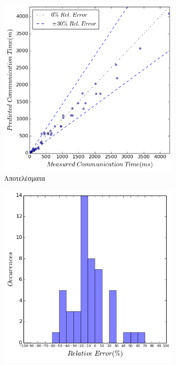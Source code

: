 \begin{figure}[ht]
    \centering
    \captionsetup{justification=centering,margin=0cm,font=footnotesize}
    \begin{subfigure}[b]{0.47\textwidth}
        \includegraphics[width=\textwidth]{./images/NB+cg_avgonly_UMA/jacobi_res.png}
        \caption{Αποτελέσματα}
    \end{subfigure}
    \quad %
    \begin{subfigure}[b]{0.47\textwidth}
        \includegraphics[width=\textwidth]{./images/NB+cg_avgonly_UMA/jacobi_err_dist.png}

\end{subfigure}
\end{figure}
